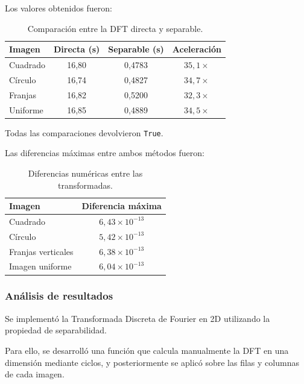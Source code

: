 \documentclass[11pt,letterpaper]{article}
\begin{document}
Los valores obtenidos fueron:

\begin{table}[H]
\centering
\caption{Comparación entre la DFT directa y separable.}
\label{tab:comparacion}

\small

\begin{tabular}{lccc}
\toprule
\textbf{Imagen} &
\textbf{Directa (s)} &
\textbf{Separable (s)} &
\textbf{Aceleración}\\
\midrule
Cuadrado & 16,80 & 0,4783 & $35,1\times$\\
Círculo & 16,74 & 0,4827 & $34,7\times$\\
Franjas & 16,82 & 0,5200 & $32,3\times$\\
Uniforme & 16,85 & 0,4889 & $34,5\times$\\
\bottomrule
\end{tabular}

\end{table}

Todas las comparaciones devolvieron
\texttt{True}.

Las diferencias máximas entre ambos métodos
fueron:

\begin{table}[H]
\centering
\caption{Diferencias numéricas entre las transformadas.}
\label{tab:diferencias}

\begin{tabular}{lc}
\toprule
\textbf{Imagen} & \textbf{Diferencia máxima}\\
\midrule
Cuadrado & $6,43\times10^{-13}$\\
Círculo & $5,42\times10^{-13}$\\
Franjas verticales & $6,38\times10^{-13}$\\
Imagen uniforme & $6,04\times10^{-13}$\\
\bottomrule
\end{tabular}

\end{table}

\subsubsection*{Análisis de resultados}

Se implementó la Transformada Discreta de Fourier
en 2D utilizando la propiedad de separabilidad.

Para ello, se desarrolló una función que calcula
manualmente la DFT en una dimensión mediante ciclos,
y posteriormente se aplicó sobre las filas
y columnas de cada imagen.
\end{document}
